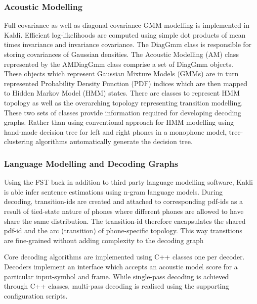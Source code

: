\subsubsection{Acoustic Modelling}
Full covariance as well as diagonal covariance GMM modelling is implemented in Kaldi. Efficient log-likelihoods are computed using simple dot products of mean times invariance and invariance covariance.  The DiagGmm class is responsible for storing covariances of Gaussian densities. The Acoustic Modelling (AM) class represented by the AMDiagGmm class comprise a set of DiagGmm objects.  These objects which represent Gaussian Mixture Models (GMMs) are in turn represented Probability Density Function (PDF) indices which are then mapped to Hidden Markov Model (HMM) states. There are classes to represent HMM topology as well as the overarching topology representing transition modelling. These two sets of classes provide information required for developing decoding graphs.  Rather than using conventional approach for HMM modelling using hand-made decision tree for left and right phones in a monophone model, tree-clustering algorithms automatically generate the decision tree.

\subsubsection{Language Modelling and Decoding Graphs}
Using the FST back in addition to third party language modelling software, Kaldi is able infer sentence estimations using n-gram language models. During decoding, transition-ids are created and attached to corresponding pdf-ids as a result of tied-state nature of phones where different phones are allowed to have share the same distribution.  The transition-id therefore encapsulates the shared pdf-id and the arc (transition) of phone-specific topology. This way transitions are fine-grained without adding complexity to the decoding graph

Core decoding algorithms are implemented using C++ classes one per decoder.  Decoders implement an interface which accepts an acoustic model score for a particular input-symbol and frame.  While single-pass decoding is achieved through C++ classes, multi-pass decoding is realised using the supporting configuration scripts.

